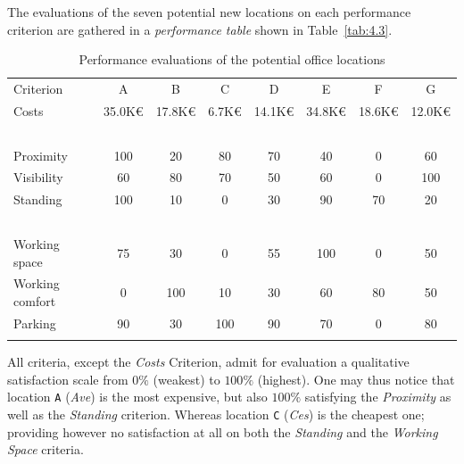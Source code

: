 The evaluations of the seven potential new locations on each performance criterion are gathered in a \emph{performance table} shown in Table~\vref{tab:4.3}.
\begin{table}[ht]
\caption{Performance evaluations of the potential office locations}
\label{tab:4.3}       %
\begin{center}
    \begin{tabular}{l|c|c|c|c|c|c|c}
      \svhline\noalign{\smallskip}
    Criterion  &    A  &      B &       C &       D &       E &        F &        G\\
       \noalign{\smallskip}\hline\noalign{\smallskip}

    Costs      &   35.0K€ &  17.8K€  & 6.7K€  &  14.1K€ &  34.8K€ &  18.6K€ &  12.0K€\\
    \          &   \      &  \     &   \     &   \    &    \    &    \    &    \ \\
    Proximity     &   100    &  20 &      80    &   70    &   40    &   0    &    60 \\
    Visibility     &   60     &  80  &     70    &   50    &   60    &   0    &    100 \\
    Standing      &   100   &   10   &    0     &   30    &   90    &   70   &    20 \\
    \           &   \     &   \    &    \     &   \     &   \     &   \    &    \  \\
    Working space      &   75    &   30   &    0     &   55    &   100   &   0    &    50  \\
    Working comfort      &   0     &   100  &    10    &   30    &   60    &   80   &    50 \\
    Parking     &   90    &   30   &    100   &   90    &   70    &   0    &    80 \\
      \noalign{\smallskip}\hline
    \end{tabular}
  \end{center}
\end{table}
All criteria, except the \emph{Costs} Criterion, admit for evaluation a qualitative satisfaction scale from $0\%$ (weakest) to $100\%$ (highest). One may thus notice that location \texttt{A} (\emph{Ave}) is the most expensive, but also $100\%$ satisfying the \emph{Proximity} as well as the  \emph{Standing} criterion. Whereas location \texttt{C} (\emph{Ces}) is the cheapest one; providing however no satisfaction at all on both the \emph{Standing} and the \emph{Working Space} criteria.


